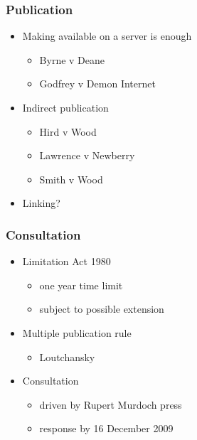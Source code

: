 \documentclass[ignorenonframetext,]{beamer}
\begin{document}
\begin{frame}
\frametitle{Publication}

\begin{itemize}
\item  Making available on a server is enough

  \begin{itemize}
  \item    Byrne v Deane
  \item    Godfrey v Demon Internet
  \end{itemize}
\item  Indirect publication

  \begin{itemize}
  \item    Hird v Wood
  \item    Lawrence v Newberry
  \item    Smith v Wood
  \end{itemize}
\item  Linking?
\end{itemize}

\end{frame}

\begin{frame}
\frametitle{Consultation}

\begin{itemize}
\item  Limitation Act 1980

  \begin{itemize}
  \item    one year time limit
  \item    subject to possible extension
  \end{itemize}
\item  Multiple publication rule

  \begin{itemize}
  \item    Loutchansky
  \end{itemize}
\item  Consultation

  \begin{itemize}
  \item    driven by Rupert Murdoch press
  \item    response by 16 December 2009
  \end{itemize}
\end{itemize}

\end{frame}
\end{document}
